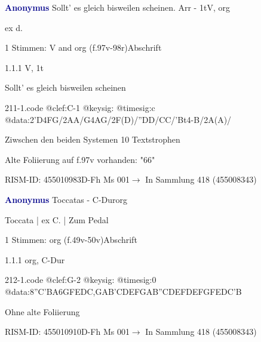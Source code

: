 \documentclass[twocolumn]{book}
\begin{document}
\par \vspace{7pt} \textcolor{darkblue}{\textbf{Anonymus  }}\hfillplus{\textbf{[211]}}\newline Sollt' es gleich bisweilen scheinen. Arr - 1t\newline V, org
\par \begin{itshape}[f.97v, at left:] ex d.\end{itshape} 
\par \textcolor{darkblue}{}  1 Stimmen: V and org  (f.97v-98r)\newline Abschrift
\par 1.1.1  V, 1t\newline \begin{footnotesize} Sollt' es gleich bisweilen scheinen \end{footnotesize}  
\begin{filecontents*}{211-1.code}
@clef:C-1
@keysig:
@timesig:c
@data:2'D4FG/2AA/G4AG/2F(D)/''DD/CC/'Bt4-B/2A(A)/
\end{filecontents*}
\newline
%
\par Ziwschen den beiden Systemen 10 Textstrophen
\par Alte Foliierung auf f.97v vorhanden: "66"
\par RISM-ID: 455010983\newline D-Fh  Ms 001\newline $\rightarrow$ In Sammlung 418 (455008343)
      
\par \vspace{7pt} \textcolor{darkblue}{\textbf{Anonymus  }}\hfillplus{\textbf{[212]}}\newline Toccatas - C-Dur\newline org
\par \begin{itshape}[f.49v, at left:] Toccata | ex C. | Zum Pedal\end{itshape} 
\par \textcolor{darkblue}{}  1 Stimmen: org  (f.49v-50v)\newline Abschrift
\par 1.1.1  org, C-Dur  
\begin{filecontents*}{212-1.code}
@clef:G-2
@keysig:
@timesig:0
@data:8''C{'BA}{6GFED}{C,GAB}{'CDEF}{GAB''C}{DEFD}{EFGF}{EDC'B}
\end{filecontents*}
\newline
%
\par Ohne alte Foliierung
\par RISM-ID: 455010910\newline D-Fh  Ms 001\newline $\rightarrow$ In Sammlung 418 (455008343)
      
\end{document}
